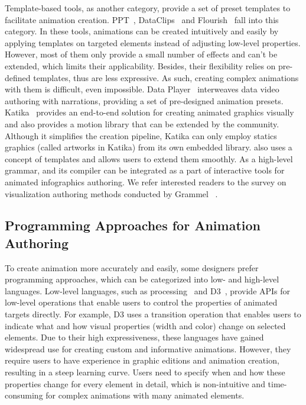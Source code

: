 Template-based tools, as another category, provide a set of preset templates to facilitate animation creation.
PPT~\cite{msppt}, DataClips~\cite{amini2016authoring} and Flourish~\cite{flourish} fall into this category.
In these tools, animations can be created intuitively and easily by applying templates on targeted elements instead of adjusting low-level properties. 
However, most of them only provide a small number of effects and can't be extended, which limits their applicability. 
Besides, their flexibility relies on pre-defined templates, thus are less expressive.
As such, creating complex animations with them is difficult, even impossible.
Data Player~\cite{shen2023dataplayer} interweaves data video authoring with narrations, providing a set of pre-designed animation presets.
Katika~\cite{jahanlou2022katika} provides an end-to-end solution for creating animated graphics visually and also provides a motion library that can be extended by the community. 
Although it simplifies the creation pipeline, Katika can only employ statics graphics (called artworks in Katika) from its own embedded library.
\gaia{} also uses a concept of templates and allows users to extend them smoothly.
As a high-level grammar, \gaia{} and its compiler can be integrated as a part of interactive tools for animated infographics authoring.
We refer interested readers to the survey on visualization authoring methods conducted by Grammel \etal~\cite{grammel2013survey}.

\subsection{Programming Approaches for Animation Authoring}
To create animation more accurately and easily, some designers prefer programming approaches, which can be categorized into low- and high-level languages.
Low-level languages, such as processing~\cite{processing} and D3~\cite{bostock2011d3}, provide APIs for low-level operations that enable users to control the properties of animated targets directly.
For example, D3 uses a transition operation that enables users to indicate what and how visual properties (\eg width and color) change on selected elements.
Due to their high expressiveness, these languages have gained widespread use for creating custom and informative animations.
However, they require users to have experience in graphic editions and animation creation, resulting in a steep learning curve. 
Users need to specify when and how these properties change for every element in detail, which is non-intuitive and time-consuming for complex animations with many animated elements.

